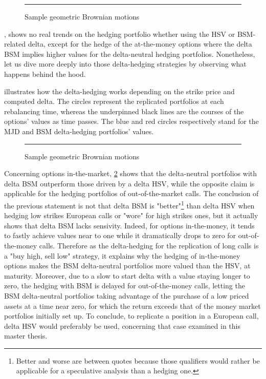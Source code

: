 \documentclass[12pt]{report}
\begin{document}
\begin{figure}[h]
  \centering
  \rule{40mm}{20mm}
  \caption{Sample geometric Brownian motions}
  \label{p:analysis:hsv:pl:dist:deltas}
\end{figure}

, shows no real trends on the hedging portfolio whether using the HSV or BSM-related delta, except for the hedge of the at-the-money options where the delta BSM implies higher values for the delta-neutral hedging portfolios.
Nonetheless, let us dive more deeply into those delta-hedging strategies by observing what happens behind the hood.

 illustrates how the delta-hedging works depending on the strike price and computed delta.
The circles represent the replicated portfolios at each rebalancing time, whereas the underpinned black lines are the courses of the options' values as time passes.
The blue and red circles respectively stand for the MJD and BSM delta-hedging portfolios' values.
% 
\begin{figure}[h]
  \centering
  \rule{40mm}{20mm}
  \caption{Sample geometric Brownian motions}
  \label{p:analysis:hsv:hedge:deltas}
\end{figure}


Concerning options in-the-market, \cref{p:analysis:hsv:hedge:deltas} shows that the delta-neutral portfolios with delta BSM outperform those driven by a delta HSV, while the opposite claim is applicable for the hedging portfolios of out-of-the-market calls.
The conclusion of the previous statement is not that delta BSM is "better"\footnote{Better and worse are between quotes because those qualifiers would rather be applicable for a speculative analysis than a hedging one.} than delta HSV when hedging low strikes European calls or "wore" for high strikes ones, but it actually shows that delta BSM lacks sensivity.
Indeed, for options in-the-money, it tends to fastly achieve values near to one while it dramatically drops to zero for out-of-the-money calls.
Therefore as the delta-hedging for the replication of long calls is a "buy high, sell low" strategy, it explains why the hedging of in-the-money options makes the BSM delta-neutral portfolios more valued than the HSV, at maturity. 
Moreover, due to a slow to start delta with a value staying longer to zero, the hedging with BSM is delayed for out-of-the-money calls, letting the BSM delta-neutral portfolios taking advantage of the purchase of a low priced assets at a time near zero, for which the return exceeds that of the money market portfolios initially set up.
To conclude, to replicate a position in a European call, delta HSV would preferably be used, concerning that case examined in this master thesis. 
\end{document}
